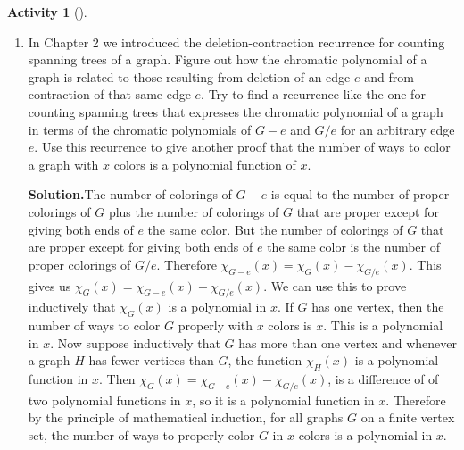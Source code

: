 \documentclass[10pt,]{book}
\theoremstyle{plain}
\theoremstyle{definition}
\newtheorem{activity}[project]{Activity}
\numberwithin{equation}{chapter}
\begin{document}
\begin{activity}[]\label{chrompolydel_cont}
~\par
\begin{enumerate}[label=(\alph*)]
 \item In Chapter 2 we introduced the deletion-contraction recurrence for counting spanning trees of a graph. Figure out how the chromatic polynomial of a graph is related to those resulting from deletion of an edge \(e\) and from contraction of that same edge \(e\). Try to find a recurrence like the one for counting spanning trees that expresses the chromatic polynomial of a graph in terms of the chromatic polynomials of \(G-e\) and \(G/e\) for an arbitrary edge \(e\). Use this recurrence to give another proof that the number of ways to color a graph with \(x\) colors is a polynomial function of \(x\).%
\par\medskip\noindent%
\textbf{Solution.}\quad The number of colorings of \(G-e\) is equal to the number of proper colorings of \(G\) plus the number of colorings of \(G\) that are proper except for giving both ends of \(e\) the same color. But the number of colorings of \(G\) that are proper except for giving both ends of \(e\) the same color is the number of proper colorings of \(G/e\). Therefore \(\chi_{G-e}(x) =\chi_G(x)
-\chi_{G/e}(x)\). This gives us \(\chi_G(x) = \chi_{G-e}(x)
-\chi_{G/e}(x)\). We can use this to prove inductively that \(\chi_G(x)\) is a polynomial in \(x\). If \(G\) has one vertex, then the number of ways to color \(G\) properly with \(x\) colors is \(x\). This is a polynomial in \(x\). Now suppose inductively that \(G\) has more than one vertex and whenever a graph \(H\) has fewer vertices than \(G\), the function \(\chi_H(x)\) is a polynomial function in \(x\). Then \(\chi_G(x)= \chi_{G-e}(x)-\chi_{G/e}(x)\), is a difference of of two polynomial functions in \(x\), so it is a polynomial function in \(x\). Therefore by the principle of mathematical induction, for all graphs \(G\) on a finite vertex set, the number of ways to properly color \(G\) in \(x\) colors is a polynomial in \(x\).%


\end{enumerate}
\end{activity}
\end{document}
